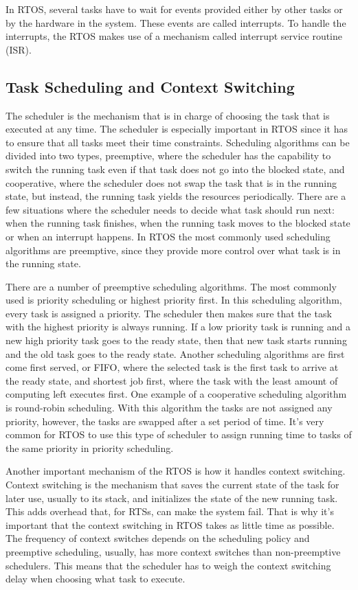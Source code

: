 In RTOS, several tasks have to wait for events provided either by other tasks or by the hardware in the system. These events are called interrupts. To handle the interrupts, the RTOS makes use of a mechanism called interrupt service routine (ISR). 

\subsection{Task Scheduling and Context Switching}
The scheduler is the mechanism that is in charge of choosing the task that is executed at any time. The scheduler is especially important in RTOS since it has to ensure that all tasks meet their time constraints. Scheduling algorithms can be divided into two types, preemptive, where the scheduler has the capability to switch the running task even if that task does not go into the blocked state, and cooperative, where the scheduler does not swap the task that is in the running state, but instead, the running task yields the resources periodically. There are a few situations where the scheduler needs to decide what task should run next: when the running task finishes, when the running task moves to the blocked state or when an interrupt happens. In RTOS the most commonly used scheduling algorithms are preemptive, since they provide more control over what task is in the running state.

There are a number of preemptive scheduling algorithms. The most commonly used is priority scheduling or highest priority first. In this scheduling algorithm, every task is assigned a priority. The scheduler then makes sure that the task with the highest priority is always running. If a low priority task is running and a new high priority task goes to the ready state, then that new task starts running and the old task goes to the ready state. Another scheduling algorithms are first come first served, or FIFO, where the selected task is the first task to arrive at the ready state, and shortest job first, where the task with the least amount of computing left executes first. One example of a cooperative scheduling algorithm is round-robin scheduling. With this algorithm the tasks are not assigned any priority, however, the tasks are swapped after a set period of time. It's very common for RTOS to use this type of scheduler to assign running time to tasks of the same priority in priority scheduling.

Another important mechanism of the RTOS is how it handles context switching. Context switching is the mechanism that saves the current state of the task for later use, usually to its stack, and initializes the state of the new running task. This adds overhead that, for RTSs, can make the system fail. That is why it's important that the context switching in RTOS takes as little time as possible. The frequency of context switches depends on the scheduling policy and preemptive scheduling, usually, has more context switches than non-preemptive schedulers. This means that the scheduler has to weigh the context switching delay when choosing what task to execute.

